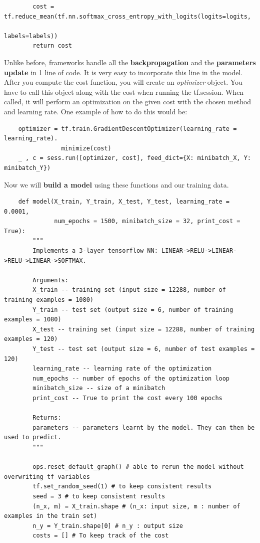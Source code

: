 \documentclass[11pt, a4paper]{article}
\begin{document}
\begin{spacing}{1.1}
\begin{lstlisting}
		cost = tf.reduce_mean(tf.nn.softmax_cross_entropy_with_logits(logits=logits, 
		                                                              labels=labels))
		return cost	\end{lstlisting} \vspace*{1mm}
	Unlike before, frameworks handle all the \textbf{backpropagation} and the \textbf{parameters update} in 1 line of code. It is very easy to incorporate this line in the model. After you compute the cost function, you will create an \textit{optimizer} object. You have to call this object along with the cost when running the tf.session. When called, it will perform an optimization on the given cost with the chosen method and learning rate. One example of how to do this would be: 
	\begin{lstlisting}
	optimizer = tf.train.GradientDescentOptimizer(learning_rate = learning_rate).
	            minimize(cost)
	_ , c = sess.run([optimizer, cost], feed_dict={X: minibatch_X, Y: minibatch_Y})	\end{lstlisting} \vspace*{1mm}
	Now we will \textbf{build a model} using these functions and our training data.
	\begin{lstlisting}
	def model(X_train, Y_train, X_test, Y_test, learning_rate = 0.0001,
	          num_epochs = 1500, minibatch_size = 32, print_cost = True):
		"""
		Implements a 3-layer tensorflow NN: LINEAR->RELU->LINEAR->RELU->LINEAR->SOFTMAX.
		
		Arguments:
		X_train -- training set (input size = 12288, number of training examples = 1080)
		Y_train -- test set (output size = 6, number of training examples = 1080)
		X_test -- training set (input size = 12288, number of training examples = 120)
		Y_test -- test set (output size = 6, number of test examples = 120)
		learning_rate -- learning rate of the optimization
		num_epochs -- number of epochs of the optimization loop
		minibatch_size -- size of a minibatch
		print_cost -- True to print the cost every 100 epochs
		
		Returns:
		parameters -- parameters learnt by the model. They can then be used to predict.
		"""
		
		ops.reset_default_graph() # able to rerun the model without overwriting tf variables
		tf.set_random_seed(1) # to keep consistent results
		seed = 3 # to keep consistent results
		(n_x, m) = X_train.shape # (n_x: input size, m : number of examples in the train set)
		n_y = Y_train.shape[0] # n_y : output size
		costs = [] # To keep track of the cost \end{lstlisting} \newpage


\end{spacing}
\end{document}
